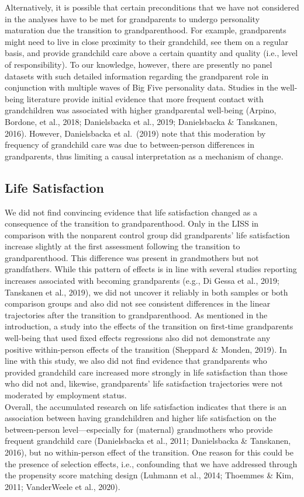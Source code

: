 \documentclass[
  english,
  man, noextraspace]{apa7}
\begin{document}
Alternatively, it is possible that certain preconditions that we have not considered in the analyses have to be met for grandparents to undergo personality maturation due the transition to grandparenthood. For example, grandparents might need to live in close proximity to their grandchild, see them on a regular basis, and provide grandchild care above a certain quantity and quality (i.e., level of responsibility). To our knowledge, however, there are presently no panel datasets with such detailed information regarding the grandparent role in conjunction with multiple waves of Big Five personality data. Studies in the well-being literature provide initial evidence that more frequent contact with grandchildren was associated with higher grandparental well-being (Arpino, Bordone, et al., 2018; Danielsbacka et al., 2019; Danielsbacka \& Tanskanen, 2016). However, Danielsbacka et al.~(2019) note that this moderation by frequency of grandchild care was due to between-person differences in grandparents, thus limiting a causal interpretation as a mechanism of change.

\hypertarget{life-satisfaction-2}{%
\subsection{Life Satisfaction}\label{life-satisfaction-2}}

We did not find convincing evidence that life satisfaction changed as a consequence of the transition to grandparenthood. Only in the LISS in comparison with the nonparent control group did grandparents' life satisfaction increase slightly at the first assessment following the transition to grandparenthood. This difference was present in grandmothers but not grandfathers. While this pattern of effects is in line with several studies reporting increases associated with becoming grandparents (e.g., Di Gessa et al., 2019; Tanskanen et al., 2019), we did not uncover it reliably in both samples or both comparison groups and also did not see consistent differences in the linear trajectories after the transition to grandparenthood. As mentioned in the introduction, a study into the effects of the transition on first-time grandparents well-being that used fixed effects regressions also did not demonstrate any positive within-person effects of the transition (Sheppard \& Monden, 2019). In line with this study, we also did not find evidence that grandparents who provided grandchild care increased more strongly in life satisfaction than those who did not and, likewise, grandparents' life satisfaction trajectories were not moderated by employment status.\\
Overall, the accumulated research on life satisfaction indicates that there is an association between having grandchildren and higher life satisfaction on the between-person level---especially for (maternal) grandmothers who provide frequent grandchild care (Danielsbacka et al., 2011; Danielsbacka \& Tanskanen, 2016), but no within-person effect of the transition. One reason for this could be the presence of selection effects, i.e., confounding that we have addressed through the propensity score matching design (Luhmann et al., 2014; Thoemmes \& Kim, 2011; VanderWeele et al., 2020).
\end{document}
